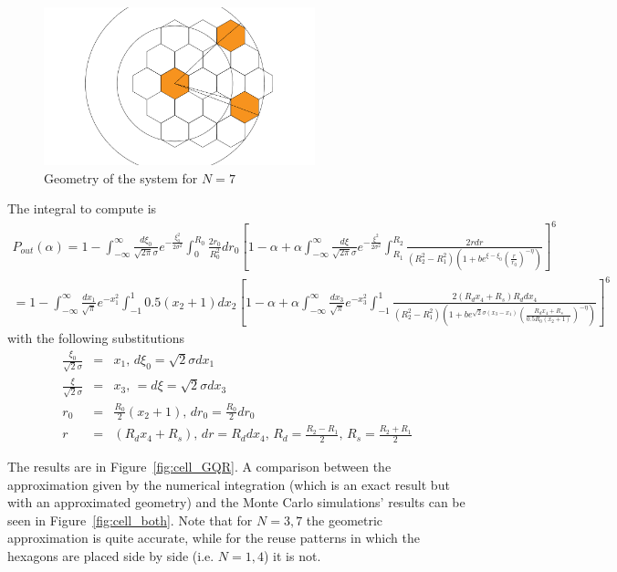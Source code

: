 \documentclass[10pt]{article}
\begin{document}
\begin{figure}
  \centering
  \includegraphics[width = 0.7\textwidth]{hexa}
  \caption{Geometry of the system for $N = 7$}
  \label{fig:hexa_cell}
\end{figure}


The integral to compute is 
\begin{eqnarray}
P_{out}(\alpha)  =   1 - \int_{-\infty}^{\infty} \frac{d\xi_0}{\sqrt{2\pi}\sigma} e^{-\frac{\xi_0^2}{2\sigma^2}} \int_0^{R_0} \frac{2 r_0}{R_0^2} dr_0 \left[
  1 - \alpha + \alpha \int_{-\infty}^{\infty} 
  \frac{d\xi}{\sqrt{2\pi}\sigma} 
  e^{-\frac{\xi^2}{2\sigma^2}} 
  \int_{R_1}^{R_2} 
  \frac{2r dr}{(R_2^2-R_1^2)\left(1 + b e^{\xi - \xi_0} \left( \frac{r}{r_0} \right)^{-\eta}\right)}
  \right]^{6}
  \\
   =  1 - \int_{-\infty}^{\infty} \frac{dx_1}{\sqrt{\pi}} e^{-x_1^2} \int_{-1}^{1} 0.5(x_2+1) dx_2 \left[
  1 - \alpha + \alpha \int_{-\infty}^{\infty} 
  \frac{dx_3}{\sqrt{\pi}} 
  e^{-x_3^2} 
  \int_{-1}^{1} 
  \frac{2(R_dx_4 + R_s) R_d dx_4}{(R_2^2-R_1^2)\left(1 + b e^{\sqrt{2}\sigma(x_3 - x_1)} 
  \left( \frac{R_dx_4 + R_s}{0.5R_0(x_2+1)} \right)^{-\eta}\right)}
  \right]^{6}
\end{eqnarray}
with the following substitutions
\begin{eqnarray*}
  \frac{\xi_0}{\sqrt{2}\sigma} &=& x_1, \, d\xi_0 = \sqrt{2}\sigma dx_1 \\ 
  \frac{\xi}{\sqrt{2}\sigma} &=& x_3, \, = d\xi = \sqrt{2}\sigma dx_3  \\
  r_0 &=& \frac{R_0}{2}(x_2 + 1), \, dr_0 = \frac{R_0}{2} dr_0\\
  r &=& (R_d x_4 + R_s), \, dr = R_d dx_4, \, R_d = \frac{R_2 - R_1}{2}, \, R_s = \frac{R_2 + R_1}{2}
\end{eqnarray*}

The results are in Figure~\ref{fig:cell_GQR}. A comparison between the approximation given by the numerical integration (which is an exact result but with an approximated geometry) and the Monte Carlo simulations' results can be seen in Figure~\ref{fig:cell_both}. Note that for $N= 3, 7$ the geometric approximation is quite accurate, while for the reuse patterns in which the hexagons are placed side by side (i.e. $N= 1, 4$) it is not. 
\end{document}
